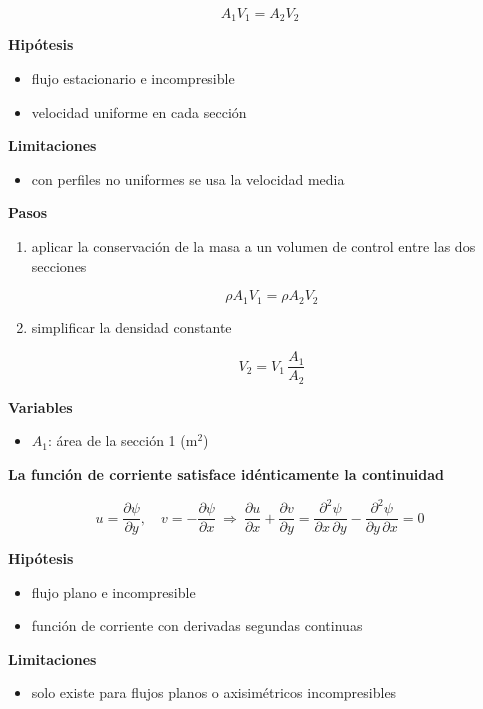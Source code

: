 \documentclass[10pt,openany]{book}
\begin{document}
\begin{tcolorbox}[title={Desarrollos del modelo}, studiumdef, breakable]
\begin{equation}
A_1 V_1 = A_2 V_2
\label{eq:c12-conducto}
\end{equation}

\noindent\textbf{Hipótesis}
\begin{itemize}
\item flujo estacionario e incompresible
\item velocidad uniforme en cada sección
\end{itemize}

\noindent\textbf{Limitaciones}
\begin{itemize}
\item con perfiles no uniformes se usa la velocidad media
\end{itemize}

\noindent\textbf{Pasos}
\begin{enumerate}
\item
aplicar la conservación de la masa a un volumen de control entre las dos secciones

\[
\rho A_1 V_1 = \rho A_2 V_2
\]
\item
simplificar la densidad constante

\[
V_2 = V_1\,\frac{A_1}{A_2}
\]
\end{enumerate}

\noindent\textbf{Variables}
\begin{itemize}
\item $A_{1}$: área de la sección 1 ($\mathrm{m}^{2}$)
\end{itemize}



\noindent\textbf{La función de corriente satisface idénticamente la continuidad}

\begin{equation}
u = \frac{\partial\psi}{\partial y},\quad v = -\frac{\partial\psi}{\partial x}\ \Rightarrow\ \frac{\partial u}{\partial x} + \frac{\partial v}{\partial y} = \frac{\partial^{2}\psi}{\partial x\,\partial y} - \frac{\partial^{2}\psi}{\partial y\,\partial x} = 0
\label{eq:c12-corriente}
\end{equation}

\noindent\textbf{Hipótesis}
\begin{itemize}
\item flujo plano e incompresible
\item función de corriente con derivadas segundas continuas
\end{itemize}

\noindent\textbf{Limitaciones}
\begin{itemize}
\item solo existe para flujos planos o axisimétricos incompresibles
\end{itemize}


\end{tcolorbox}
\end{document}
